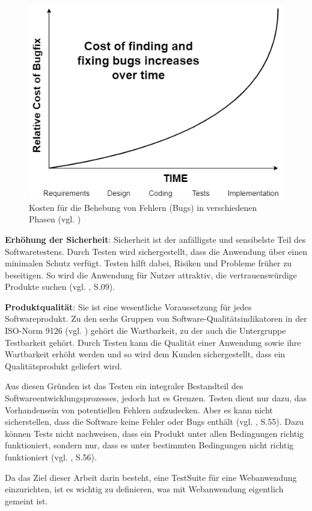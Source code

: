 \begin{figure}[H]
    \centering
    \includegraphics[scale=0.5]{images/Cost-of-fixing-bugs-in-different-phases}
    \caption{Kosten für die Behebung von Fehlern (Bugs) in verschiedenen Phasen (vgl. \cite{kumar2010software})} \label{fig:mof}
\end{figure}


\textbf{Erhöhung der Sicherheit}: Sicherheit ist der anfälligste und
sensibelste Teil des Softwaretestens. Durch Testen wird sichergestellt,
dass die Anwendung über einen minimalen Schutz verfügt. Testen hilft
dabei, Risiken und Probleme früher zu beseitigen. So wird die Anwendung für Nutzer attraktiv,
die vertrauenswürdige Produkte suchen (vgl. \cite{shultz2011software}, S.09).

\textbf{Produktqualität}: Sie ist eine wesentliche
Voraussetzung für jedes Softwareprodukt. Zu den sechs Gruppen von Software-Qualitätsindikatoren
in der ISO-Norm 9126 (vgl. \cite{AlainAbran2010}) gehört die Wartbarkeit, zu der auch die Untergruppe Testbarkeit gehört.
Durch Testen kann die Qualität einer Anwendung sowie ihre Wartbarkeit erhöht werden und so wird dem Kunden sichergestellt,
dass ein Qualitätsprodukt geliefert wird.


Aus diesen Gründen ist das Testen ein
integraler Bestandteil des Softwareentwicklungsprozesses, jedoch hat es Grenzen.
Testen dient nur dazu, das Vorhandensein von potentiellen Fehlern
aufzudecken. Aber es kann nicht sicherstellen, dass
die Software keine Fehler oder Bugs enthält (vgl. \cite{kumar2010software}, S.55).
Dazu können Tests nicht nachweisen, dass ein Produkt unter allen
Bedingungen richtig funktioniert, sondern nur, dass es unter
bestimmten Bedingungen nicht richtig funktioniert (vgl. \cite{kumar2010software}, S.56).



Da das Ziel dieser Arbeit darin besteht, eine \gls{TestSuite} für
eine Webanwendung einzurichten, ist es wichtig zu
definieren, was mit Webanwendung eigentlich gemeint ist.
